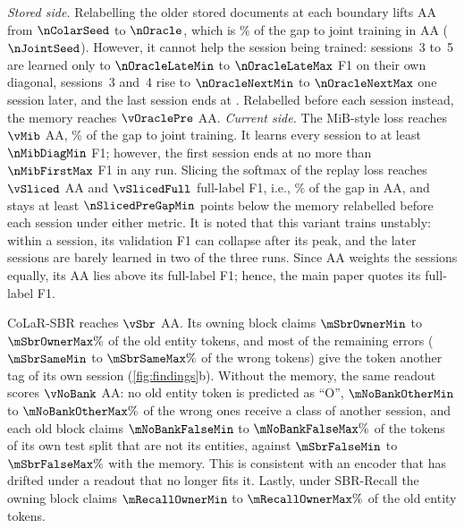  \emph{Stored side.} Relabelling the older stored documents at each boundary lifts AA from $\nColarSeed$ to $\nOracle$, which is \nOracleShare\% of the gap to joint training in AA ($\nJointSeed$). However, it cannot help the session being trained: sessions~3 to~5 are learned only to $\nOracleLateMin$ to $\nOracleLateMax$ F1 on their own diagonal, sessions~3 and~4 rise to $\nOracleNextMin$ to $\nOracleNextMax$ one session later, and the last session ends at \nOracleLast. Relabelled before each session instead, the memory reaches $\vOraclePre$ AA. \emph{Current side.} The MiB-style loss reaches $\vMib$ AA, \nMibShare\% of the gap to joint training. It learns every session to at least $\nMibDiagMin$ F1; however, the first session ends at no more than $\nMibFirstMax$ F1 in any run. Slicing the softmax of the replay loss reaches $\vSliced$ AA and $\vSlicedFull$ full-label F1, i.e., \nSlicedShare\% of the gap in AA, and stays at least $\nSlicedPreGapMin$ points below the memory relabelled before each session under either metric. It is noted that this variant trains unstably: within a session, its validation F1 can collapse after its peak, and the later sessions are barely learned in two of the three runs. Since AA weights the sessions equally, its AA lies above its full-label F1; hence, the main paper quotes its full-label F1.

 CoLaR-SBR reaches $\vSbr$ AA. Its owning block claims $\mSbrOwnerMin$ to $\mSbrOwnerMax\%$ of the old entity tokens, and most of the remaining errors ($\mSbrSameMin$ to $\mSbrSameMax\%$ of the wrong tokens) give the token another tag of its own session (\cref{fig:findings}b). Without the memory, the same readout scores $\vNoBank$ AA: no old entity token is predicted as ``O'', $\mNoBankOtherMin$ to $\mNoBankOtherMax\%$ of the wrong ones receive a class of another session, and each old block claims $\mNoBankFalseMin$ to $\mNoBankFalseMax\%$ of the tokens of its own test split that are not its entities, against $\mSbrFalseMin$ to $\mSbrFalseMax\%$ with the memory. This is consistent with an encoder that has drifted under a readout that no longer fits it. Lastly, under SBR-Recall the owning block claims $\mRecallOwnerMin$ to $\mRecallOwnerMax\%$ of the old entity tokens.

\begin{table}[t]
\centering\small
\setlength{\tabcolsep}{4pt}
\caption{\textbf{CIL-FUNSD} (LayoutLMv3, $10$ stored forms per session; mean $\pm$ s.d.). $R[2,1]$: F1 of session~1 after session~2 (range over the runs). $^{r}$Uses the ground-truth labels of the stored forms. Bold: best of each column, Joint training and the rows with ground-truth labels aside; underlined: CoLaR-SBR when another row is best.}
\label{tab:funsd}
\resizebox{\linewidth}{!}{}
\end{table}

